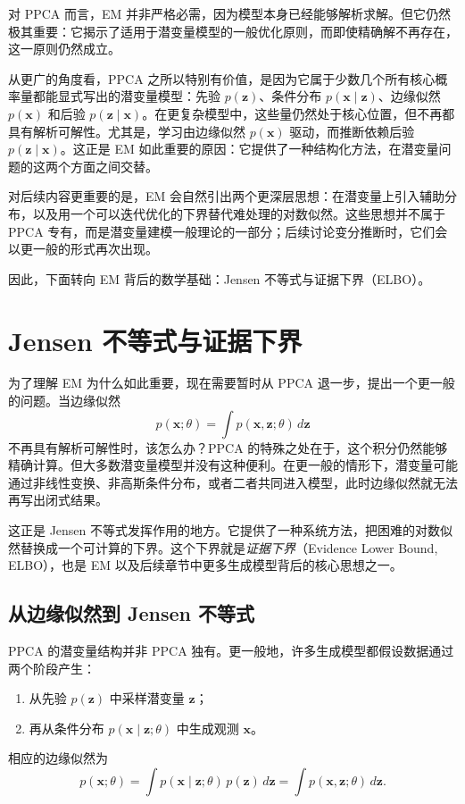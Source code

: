对 PPCA 而言，EM 并非严格必需，因为模型本身已经能够解析求解。但它仍然极其重要：它揭示了适用于潜变量模型的一般优化原则，而即使精确解不再存在，这一原则仍然成立。

从更广的角度看，PPCA 之所以特别有价值，是因为它属于少数几个所有核心概率量都能显式写出的潜变量模型：先验 \(p(\mathbf{z})\)、条件分布 \(p(\mathbf{x}\mid\mathbf{z})\)、边缘似然 \(p(\mathbf{x})\) 和后验 \(p(\mathbf{z}\mid\mathbf{x})\)。在更复杂模型中，这些量仍然处于核心位置，但不再都具有解析可解性。尤其是，学习由边缘似然 \(p(\mathbf{x})\) 驱动，而推断依赖后验 \(p(\mathbf{z}\mid\mathbf{x})\)。这正是 EM 如此重要的原因：它提供了一种结构化方法，在潜变量问题的这两个方面之间交替。

对后续内容更重要的是，EM 会自然引出两个更深层思想：在潜变量上引入辅助分布，以及用一个可以迭代优化的下界替代难处理的对数似然。这些思想并不属于 PPCA 专有，而是潜变量建模一般理论的一部分；后续讨论变分推断时，它们会以更一般的形式再次出现。

因此，下面转向 EM 背后的数学基础：Jensen 不等式与证据下界（ELBO）。

\section{Jensen 不等式与证据下界}

为了理解 EM 为什么如此重要，现在需要暂时从 PPCA 退一步，提出一个更一般的问题。当边缘似然
\[
p(\mathbf{x};\theta)=\int p(\mathbf{x},\mathbf{z};\theta)\,d\mathbf{z}
\]
不再具有解析可解性时，该怎么办？PPCA 的特殊之处在于，这个积分仍然能够精确计算。但大多数潜变量模型并没有这种便利。在更一般的情形下，潜变量可能通过非线性变换、非高斯条件分布，或者二者共同进入模型，此时边缘似然就无法再写出闭式结果。

这正是 Jensen 不等式发挥作用的地方。它提供了一种系统方法，把困难的对数似然替换成一个可计算的下界。这个下界就是\emph{证据下界}（Evidence Lower Bound, ELBO），也是 EM 以及后续章节中更多生成模型背后的核心思想之一。

\subsection{从边缘似然到 Jensen 不等式}

PPCA 的潜变量结构并非 PPCA 独有。更一般地，许多生成模型都假设数据通过两个阶段产生：
\begin{enumerate}
    \item 从先验 \(p(\mathbf{z})\) 中采样潜变量 \(\mathbf{z}\)；
    \item 再从条件分布 \(p(\mathbf{x}\mid\mathbf{z};\theta)\) 中生成观测 \(\mathbf{x}\)。
\end{enumerate}
相应的边缘似然为
\[
p(\mathbf{x};\theta)
=
\int p(\mathbf{x}\mid\mathbf{z};\theta)\,p(\mathbf{z})\,d\mathbf{z}
=
\int p(\mathbf{x},\mathbf{z};\theta)\,d\mathbf{z}.
\]

